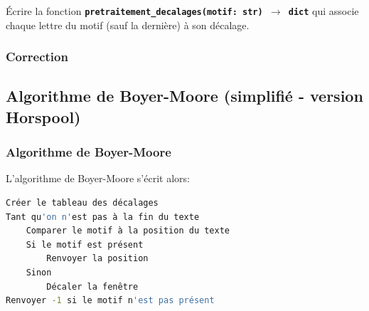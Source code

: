 \documentclass[svgnames,11pt]{beamer}
\begin{document}
\begin{frame}
    \frametitle{}

    \begin{activite}
        Écrire la fonction \textbf{\texttt{pretraitement\_decalages(motif: str) $\rightarrow$ dict}} qui associe chaque lettre du motif (sauf la dernière) à son décalage.
    \end{activite}

\end{frame}
\begin{frame}
    \frametitle{Correction}

    
\end{frame}
\subsection{Algorithme de Boyer-Moore (simplifié - version Horspool)}
\begin{frame}[fragile]
    \frametitle{Algorithme de Boyer-Moore}


    L'algorithme de Boyer-Moore s'écrit alors:
\begin{center}
\begin{lstlisting}[language=Bash, basicstyle=\small, xleftmargin=2em, xrightmargin=2em]
Créer le tableau des décalages
Tant qu'on n'est pas à la fin du texte
    Comparer le motif à la position du texte
    Si le motif est présent
        Renvoyer la position
    Sinon
        Décaler la fenêtre
Renvoyer -1 si le motif n'est pas présent
\end{lstlisting}
\label{algo}
\end{center}
\end{frame}
\end{document}
